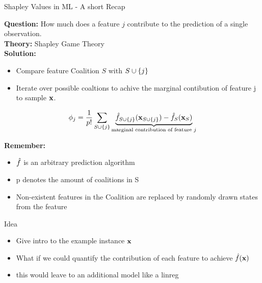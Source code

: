 \documentclass[11pt,compress,t,notes=noshow, aspectratio=169, xcolor=table]{beamer}
\begin{document}
\begin{vbframe}{Shapley Values in ML - A short Recap}
  
  \textbf{Question:} How much does a feature $j$ contribute to the prediction of a single observation. \\
  \textbf{Theory:} Shapley Game Theory \\
  \textbf{Solution:} 
  \begin{itemize}
    \item Compare feature Coalition $S$ with $\Scupj$ 
    \item Iterate over possible coaltions to achive the marginal contibution of feature j to sample $\xv$. 
\end{itemize}

     $$ \phi_j  = \frac{1}{p!} \sum_{\Scupj} \underbrace{\fh_{\Scupj}(\xv_{\Scupj}) - \fh_{S}(\xv_{S})}_{\text{marginal contribution of feature $j$}} $$

\textbf{Remember:}

\begin{itemize}
    \item $\fh$ is an arbitrary prediction algorithm
    \item p denotes the amount of coalitions in S
    \item Non-existent features in the Coalition are replaced by randomly drawn states from the feature
\end{itemize}

\end{vbframe}

\begin{vbframe}{Idea}

\begin{itemize}
    \item Give intro to the example instance $\xv$
    \item What if we could quantify the contribution of each feature to achieve $\fh(\xv)$
    \item this would leave to an additional model like a linreg
\end{itemize}


\end{vbframe}
\end{document}
